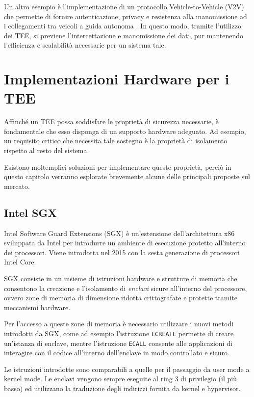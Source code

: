 \documentclass[12pt,italian]{report}
\begin{document}
	\bigbreak
	
	Un altro esempio è l'implementazione di un protocollo Vehicle-to-Vehicle (V2V) che permette di fornire autenticazione, privacy e resistenza alla manomissione ad i collegamenti tra veicoli a guida autonoma \cite{teeuses_vehicles}. In questo modo, tramite l'utilizzo dei TEE, si previene l'intercettazione e manomissione dei dati, pur mantenendo l'efficienza e scalabilità necessarie per un sistema tale.
	
	\newpage
	
	\section{Implementazioni Hardware per i TEE}
	\label{sec:supporto-hw}
	Affinché un TEE possa soddisfare le proprietà di sicurezza necessarie, è fondamentale che esso disponga di un supporto hardware adeguato. Ad esempio, un requisito critico che necessita tale sostegno è la proprietà di isolamento rispetto al resto del sistema.
	
	Esistono moltemplici soluzioni per implementare queste proprietà, perciò in questo capitolo verranno esplorate brevemente alcune delle principali proposte sul mercato.
	
	\subsection{Intel SGX}
	\label{subsec:sgx}
	Intel Software Guard Extensions (SGX) è un'estensione dell'architettura x86 sviluppata da Intel per introdurre un ambiente di esecuzione protetto all'interno dei processori. Viene introdotta nel 2015 con la sesta generazione di processori Intel Core.
	
	SGX consiste in un insieme di istruzioni hardware e strutture di memoria che consentono la creazione e l'isolamento di \textit{enclavi} sicure all'interno del processore, ovvero zone di memoria di dimensione ridotta crittografate e protette tramite meccanismi hardware. 
	
	Per l'accesso a queste zone di memoria è necessario utilizzare i nuovi metodi introdotti da SGX, come ad esempio l'istruzione \texttt{ECREATE} permette di creare un'istanza di enclave, mentre l'istruzione \texttt{ECALL} consente alle applicazioni di interagire con il codice all'interno dell'enclave in modo controllato e sicuro. 
	
	Le istruzioni introdotte sono comparabili a quelle per il passaggio da user mode a kernel mode. Le enclavi vengono sempre eseguite al ring 3 di privilegio (il più basso) ed utilizzano la traduzione degli indirizzi fornita da kernel e hypervisor.
	
\end{document}
